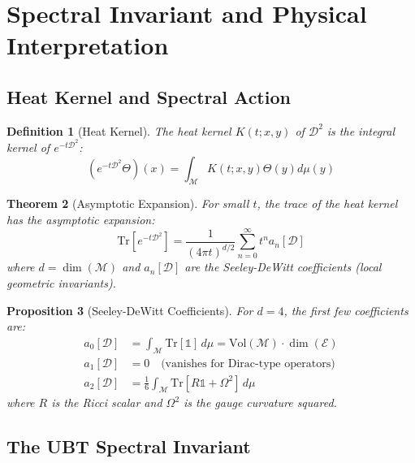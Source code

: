 \documentclass[12pt]{article}
\newtheorem{definition}{Definition}[section]
\newtheorem{theorem}[definition]{Theorem}
\newtheorem{proposition}[definition]{Proposition}
\newcommand{\M}{\mathcal{M}}
\newcommand{\Tr}{\mathrm{Tr}}
\begin{document}
\section{Spectral Invariant and Physical Interpretation}

\subsection{Heat Kernel and Spectral Action}

\begin{definition}[Heat Kernel]
The heat kernel $K(t; x, y)$ of $\mathcal{D}^2$ is the integral kernel of $e^{-t \mathcal{D}^2}$:
\begin{equation}
(e^{-t \mathcal{D}^2} \Theta)(x) = \int_\M K(t; x, y) \Theta(y) d\mu(y)
\end{equation}
\end{definition}

\begin{theorem}[Asymptotic Expansion]
For small $t$, the trace of the heat kernel has the asymptotic expansion:
\begin{equation}
\Tr[e^{-t \mathcal{D}^2}] = \frac{1}{(4\pi t)^{d/2}} \sum_{n=0}^\infty t^n a_n[\mathcal{D}]
\label{eq:heat_kernel_expansion}
\end{equation}
where $d = \dim(\M)$ and $a_n[\mathcal{D}]$ are the Seeley-DeWitt coefficients (local geometric invariants).
\end{theorem}

\begin{proposition}[Seeley-DeWitt Coefficients]
For $d=4$, the first few coefficients are:
\begin{align}
a_0[\mathcal{D}] &= \int_\M \Tr[\mathbb{1}] \, d\mu = \text{Vol}(\M) \cdot \dim(\mathcal{E}) \\
a_1[\mathcal{D}] &= 0 \quad \text{(vanishes for Dirac-type operators)} \\
a_2[\mathcal{D}] &= \frac{1}{6} \int_\M \Tr[R \mathbb{1} + \Omega^2] \, d\mu
\end{align}
where $R$ is the Ricci scalar and $\Omega^2$ is the gauge curvature squared.
\end{proposition}

\subsection{The UBT Spectral Invariant}
\end{document}
